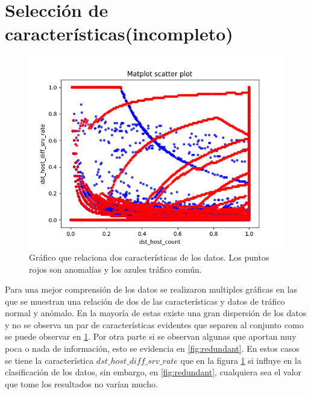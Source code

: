 \section{Selección de características(incompleto)}
\begin{figure}[b]
    \includegraphics[width=\linewidth]{Images/dst_host_count-dst_host_diff_srv_rate.png}
    \caption{Gráfico que relaciona dos características de los datos. Los puntos rojos son anomalías y los azules tráfico común.}
    \label{fig:entropy}
\end{figure}

Para una mejor comprensión de los datos se realizaron multiples gráficas en las que se muestran una relación de dos de las características y datos de tráfico normal y anómalo. En la mayoría de estas existe una gran dispersión de los datos y no se observa un par de características evidentes que separen al conjunto como se puede observar en \ref{fig:entropy}. Por otra parte si se observan algunas que aportan muy poca o nada de información, esto se evidencia en \ref{fig:redundant}. En estos casos se tiene la característica $dst\_host\_diff\_srv\_rate$ que en la figura \ref{fig:entropy} si influye en la clasificación de los datos, sin embargo, en \ref{fig:redundant}, cualquiera sea el valor que tome los resultados no varían mucho.

